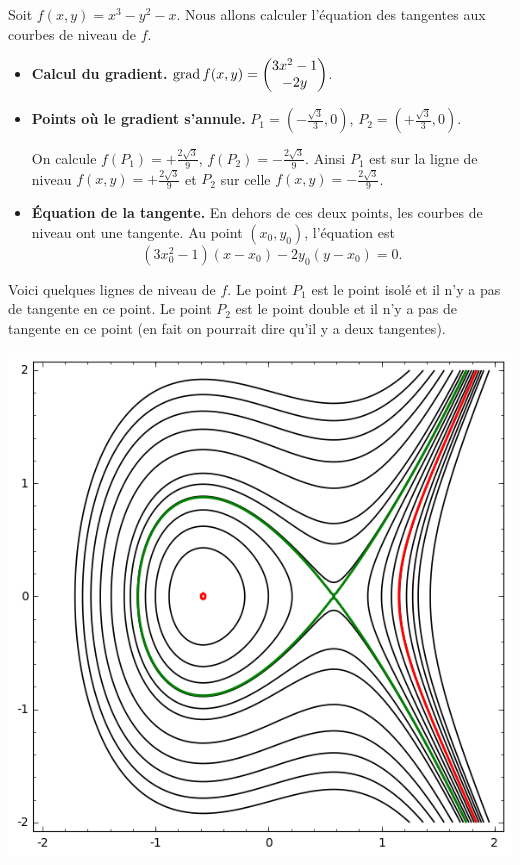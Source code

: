 \documentclass[11pt, class=report,crop=false]{standalone}
\begin{document}
\begin{exemple}
Soit $f(x,y) = x^3-y^2-x$.
Nous allons calculer l'équation des tangentes aux courbes de niveau de $f$.

\begin{itemize}
  \item \textbf{Calcul du gradient.}  
  $\operatorname{grad} f(x,y) = \begin{pmatrix} 3x^2-1 \\ -2y \end{pmatrix}$.
  
  \item \textbf{Points où le gradient s'annule.} 
  $P_1 = \left( -\frac{\sqrt 3}{3},0 \right)$, $P_2 =\left( +\frac{\sqrt 3}{3},0 \right).$
  
  On calcule $f(P_1) = +\frac{2\sqrt3}{9}$, $f(P_2) = -\frac{2\sqrt3}{9}$. Ainsi $P_1$ est sur la ligne de niveau $f(x,y) = +\frac{2\sqrt3}{9}$ et $P_2$ sur celle $f(x,y) = -\frac{2\sqrt3}{9}$.
   
  \item \textbf{\'Equation de la tangente.}  
  En dehors de ces deux points, les courbes de niveau ont une tangente.
  Au point $(x_0,y_0)$, l'équation est 
  $$(3x_0^2-1)(x-x_0) -2y_0(y-x_0) = 0.$$
\end{itemize}  


Voici quelques lignes de niveau de $f$.
Le point $P_1$ est le point isolé et il n'y a pas de tangente en ce point. Le point $P_2$ est le point double et il n'y a pas de tangente en ce point (en fait on pourrait dire qu'il y a deux tangentes).




\begin{center}
  \includegraphics[scale=0.7]{figures/fig-gradient-04}
\end{center}

\end{exemple}
\end{document}
